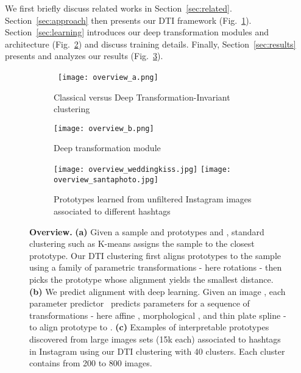 \documentclass{article}
\newcommand{\red}[1]{\textcolor{red}{#1}}
\newcommand{\green}[1]{\textcolor{mygreen}{#1}}
\newcommand{\blue}[1]{\textcolor{blue}{#1}}
\newcommand{\orange}[1]{\textcolor{myorange}{#1}}
\begin{document}
We first briefly discuss related works in Section~\ref{sec:related}.  
Section~\ref{sec:approach} then presents our DTI framework (Fig.~\ref{fig:method_a}).  
Section~\ref{sec:learning} introduces our deep transformation modules and architecture 
(Fig.~\ref{fig:method_b}) and discuss training details. Finally, Section~\ref{sec:results} 
presents and analyzes our results (Fig.~\ref{fig:teaser}). 
\begin{figure}
    \centering
    \begin{subfigure}[t]{\textwidth}
    \centering
    \qquad\qquad\qquad\,
    \texttt{[image: overview\_a.png]}
    \caption{Classical versus Deep Transformation-Invariant clustering}
    \label{fig:method_a}
    \end{subfigure}
    \begin{subfigure}[t]{\textwidth}
    \centering
    \texttt{[image: overview\_b.png]}
    \caption{Deep transformation module }
    \label{fig:method_b}
    \end{subfigure}
    \begin{subfigure}[t]{\textwidth}
    \centering
    \vspace{0.4em}
    \texttt{[image: overview\_weddingkiss.jpg]}
    \texttt{[image: overview\_santaphoto.jpg]}
    \caption{Prototypes learned from unfiltered Instagram images associated to different 
    hashtags}
    \label{fig:teaser}
    \end{subfigure}

    \caption{\textbf{Overview.}  \textbf{(a)} Given a sample \red{} and prototypes 
      \blue{} and \green{}, standard clustering such as K-means assigns the sample 
      to the closest prototype.
    Our DTI clustering first aligns prototypes to the sample using a family of parametric 
    transformations - here rotations - then picks the prototype whose alignment yields the 
    smallest distance.
    \textbf{(b)} We predict alignment with deep learning.
    Given an image \red{}, each parameter predictor~\orange{} predicts parameters 
    for a sequence of transformations - here affine 
    \orange{}, morphological \orange{}, and thin plate spline 
    \orange{}
    - to align prototype {} to \red{}.
    \textbf{(c)} Examples of interpretable prototypes discovered from large images sets (15k 
  each) associated to hashtags in Instagram using our DTI clustering with 40 clusters.  Each 
cluster contains from 200 to 800 images.}
    \label{fig:overview_DTI}
    \vspace{-1.5em}
\end{figure}
\end{document}
